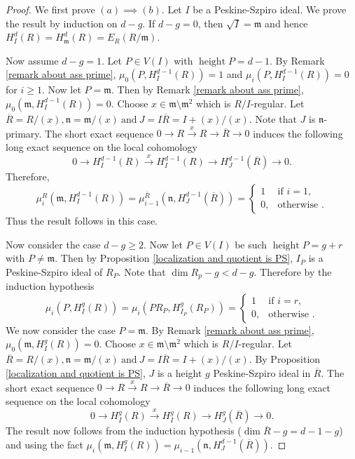 \documentclass[12pt,reqno]{amsart}
\theoremstyle{definition}
\newcommand{\m}{\mathfrak{m}}
\newcommand{\n}{\mathfrak{n}}
\newcommand{\height}{\operatorname{height}}
\begin{document}
\begin{proof}
    We first prove $(a)\implies (b)$. Let $I$ be a Peskine-Szpiro ideal. We prove the result by induction on $d-g$. If $d-g=0$, then $\sqrt{I}=\m$ and hence $H^d_I(R)=H^d_\m(R)=E_R(R/\m).$

    Now assume $d-g=1$. Let $P\in V(I)$ with $\height P=d-1$. By Remark \ref{remark about ass prime}, $\mu_0(P,H^{d-1}_I(R))=1$ and $\mu_i(P,H^{d-1}_I(R))=0$ for $i\geq 1$. Now let $P=\m$. Then by Remark \ref{remark about ass prime}, $\mu_0(\m,H^{d-1}_I(R))=0$. Choose $x\in \m\setminus \m^2$ which is $R/I$-regular. Let $\overline{R}=R/(x), \n=\m/(x) \ \text{and} \ J=I\overline{R}=I+(x)/(x)$. Note that $J$ is $\n$-primary. The short exact sequence $0\to R\xrightarrow{x}R\to \overline{R}\to 0$ induces the following long exact sequence on the local cohomology
    \begin{equation*}
        0\to H^{d-1}_I(R)\xrightarrow{x}H^{d-1}_I(R)\to H^{d-1}_J(\overline{R})\to 0.
    \end{equation*}
Therefore,
 $$
\mu^R_i\left(\m,H^{d-1}_I(R)\right) = \mu^{\overline{R}}_{i-1}\left(\n,H^{d-1}_J(\overline{R})\right)=
\begin{cases}
1 & \text{if } i=1,\\
0, & \text{otherwise }.
\end{cases}
$$
Thus the result follows in this case.

Now consider the case $d-g\geq 2$. Now let $P\in V(I)$ be such $\height P=g+r$ with $P\neq \m$. Then by Proposition \ref{localization and quotient is PS}, $I_P$ is a Peskine-Szpiro ideal of $R_P$. Note that $\dim R_p-g<d-g$. Therefore by the induction hypothesis 
 $$
\mu_i\left(P,H^{g}_I(R)\right) = \mu_{i}\left(PR_P,H^{g}_{I_P}(R_P)\right)=
\begin{cases}
1 & \text{if } i=r,\\
0, & \text{otherwise }.
\end{cases}
$$
We now consider the case $P=\m$. By Remark \ref{remark about ass prime}, $\mu_0(\m,H^g_I(R))=0$.  Choose $x\in \m\setminus \m^2$ which is $R/I$-regular. Let $\overline{R}=R/(x), \n=\m/(x) \ \text{and} \ J=I\overline{R}=I+(x)/(x)$. By Proposition \ref{localization and quotient is PS}, $J$ is a height $g$ Peskine-Szpiro ideal in $\overline{R}$. The short exact sequence $0\to R\xrightarrow{x}R\to \overline{R}\to 0$ induces the following long exact sequence on the local cohomology
    \begin{equation*}
        0\to H^{g}_I(R)\xrightarrow{x}H^{g}_I(R)\to H^{g}_J(\overline{R})\to 0.
    \end{equation*}
    The result now follows from the induction hypothesis ($\dim \overline{R}-g=d-1-g$) and using the fact $\mu_i(\m,H^g_I(R))= \mu_{i-1}\left(\n,H^{d-1}_J(\overline{R})\right)$.
\medskip


\end{proof}
\end{document}
